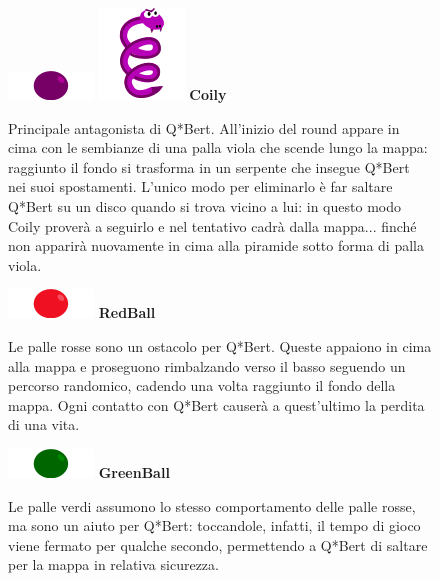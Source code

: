 \documentclass[a4paper,12pt, hidelinks]{report}
\begin{document}
\begin{figure}[H]
		\item
		\includegraphics[width=0.15\linewidth]{img/PurpleBall}
		\includegraphics[width=0.15\linewidth]{img/Coily}
		\label{img:Coily}
		\textbf{Coily}

		Principale antagonista di Q*Bert. All'inizio del round appare in cima con le sembianze di una palla viola che scende lungo la mappa: raggiunto il fondo si trasforma in un serpente che insegue Q*Bert nei suoi spostamenti. L'unico modo per eliminarlo è far saltare Q*Bert su un disco quando si trova vicino a lui: in questo modo Coily proverà a seguirlo e nel tentativo cadrà dalla mappa... finché non apparirà nuovamente in cima alla piramide sotto forma di palla viola.

\end{figure}

\begin{figure}[H]
		\item
		\includegraphics[width=0.15\linewidth]{img/RedBall}
		\label{img:RedBall}
		\textbf{RedBall}

		Le palle rosse sono un ostacolo per Q*Bert. Queste appaiono in cima alla mappa e proseguono rimbalzando verso il basso seguendo un percorso randomico, cadendo una volta raggiunto il fondo della mappa. Ogni contatto con Q*Bert causerà a quest'ultimo la perdita di una vita.

\end{figure}

\begin{figure}[H]
		\item
		\includegraphics[width=0.15\linewidth]{img/GreenBall}
		\label{img:GreenBall}
		\textbf{GreenBall}

		Le palle verdi assumono lo stesso comportamento delle palle rosse, ma sono un aiuto per Q*Bert: toccandole, infatti, il tempo di gioco viene fermato per qualche secondo, permettendo a Q*Bert di saltare per la mappa in relativa sicurezza.

\end{figure}
\end{document}
